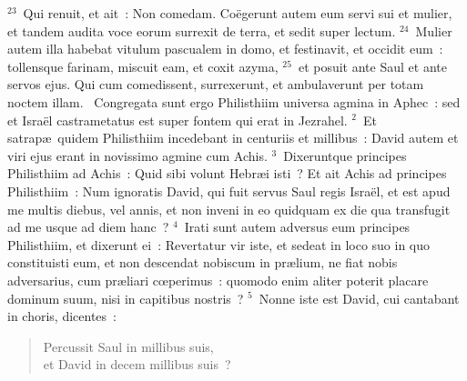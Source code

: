 ${}^{23}$~Qui renuit, et ait~: Non comedam. Co\"egerunt autem eum servi sui et mulier, et tandem audita voce eorum surrexit de terra, et sedit super lectum.
${}^{24}$~Mulier autem illa habebat vitulum pascualem in domo, et festinavit, et occidit eum~: tollensque farinam, miscuit eam, et coxit azyma,
${}^{25}$~et posuit ante Saul et ante servos ejus. Qui cum comedissent, surrexerunt, et ambulaverunt per totam noctem illam.
~\lettrine[lines=10,image=true,loversize=0.05,lraise=-0.03]{C}{}ongregata sunt ergo Philisthiim universa agmina in Aphec~: sed et Isra\"el castrametatus est super fontem qui erat in Jezrahel.
${}^{2}$~Et satrap\ae\ quidem Philisthiim incedebant in centuriis et millibus~: David autem et viri ejus erant in novissimo agmine cum Achis.
${}^{3}$~Dixeruntque principes Philisthiim ad Achis~: Quid sibi volunt Hebr\ae i isti~? Et ait Achis ad principes Philisthiim~: Num ignoratis David, qui fuit servus Saul regis Isra\"el, et est apud me multis diebus, vel annis, et non inveni in eo quidquam ex die qua transfugit ad me usque ad diem hanc~?
${}^{4}$~Irati sunt autem adversus eum principes Philisthiim, et dixerunt ei~: Revertatur vir iste, et sedeat in loco suo in quo constituisti eum, et non descendat nobiscum in pr\ae lium, ne fiat nobis adversarius, cum pr\ae liari cœperimus~: quomodo enim aliter poterit placare dominum suum, nisi in capitibus nostris~?
${}^{5}$~Nonne iste est David, cui cantabant in choris, dicentes~: \begin{flushleft}\begin{verse}Percussit Saul in millibus suis,\\ et David in decem millibus suis~?\end{verse}\end{flushleft}


